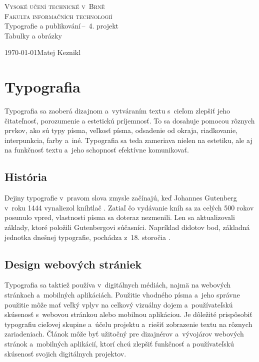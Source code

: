 \documentclass[a4paper, 11pt]{article}
\begin{document}
\begin{titlepage}
	\begin{center} 
		\textsc{\Huge Vysoké učení technické v~Brně\\
			\huge Fakulta informačních technologií \\}
			\LARGE Typografie a publikování\,--\ 4. projekt\\
			\Huge Tabulky a obrázky
			\end{center}
			\Large \today \hfill Matej Keznikl
\end{titlepage}

\section{Typografia}
Typografia sa zaoberá dizajnom a~vytváraním textu s~cieľom zlepšiť jeho čitateľnosť, porozumenie a estetickú príjemnosť. To sa dosahuje pomocou rôznych prvkov, ako sú typy písma, veľkosť písma, odsadenie od okraja, riadkovanie, interpunkcia, farby a~iné. Typografia sa teda zameriava nielen na estetiku, ale aj na funkčnosť textu a~jeho schopnosť efektívne komunikovať. \cite{KNUTH}

\subsection{História}
Dejiny typografie v~pravom slova zmysle začínajú, keď Johannes Gutenberg v~roku 1444 vynaliezol kníhtlač \cite{Gorecka2012}. Zatiaľ čo vydávanie kníh sa za celých 500 rokov posunulo vpred, vlastnosti písma sa doteraz nezmenili. Len sa aktualizovali základy, ktoré položili Gutenbergovi súčasníci. Napríklad didotov bod, základná jednotka dnešnej typografie, pochádza z~18. storočia \cite{Bures2002}. %

\subsection{Design webových strániek}
Typografia sa taktiež používa v~digitálnych médiách, najmä na webových stránkach a~mobilných aplikáciách. Použitie vhodného písma a~jeho správne použitie môže mať veľký vplyv na celkový vizuálny dojem a~používateľskú skúsenosť s~webovou stránkou alebo mobilnou aplikáciou. Je dôležité prispôsobiť typografiu cieľovej skupine a~účelu projektu a~riešiť zobrazenie textu na rôznych zariadeniach. Článok môže byť užitočný pre dizajnérov a~vývojárov webových stránok a~mobilných aplikácií, ktorí chcú zlepšiť funkčnosť a používateľskú skúsenosť svojich digitálnych projektov. \cite{WebsiteDesign}
\end{document}
